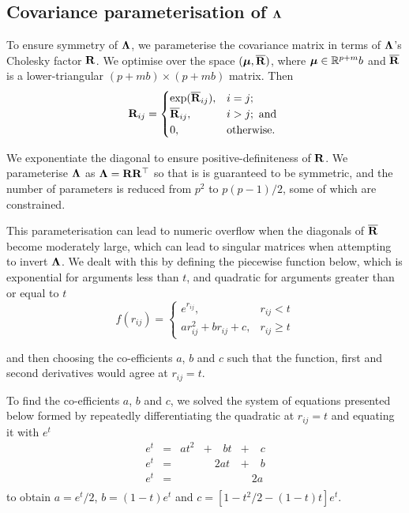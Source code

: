 \subsection{Covariance parameterisation of ${\boldsymbol \Lambda}$}
To ensure symmetry of ${\boldsymbol \Lambda}$, we parameterise the covariance matrix in
terms of ${\boldsymbol \Lambda}$'s Cholesky factor  ${\bf R}$. We optimise
over the space $({\boldsymbol \mu}, \overline{{\bf R}})$, where ${\boldsymbol \mu} \in {\mathbb{R}}^{p + m}b$ and
$\overline{{\bf R}}$ is a lower-triangular $(p + mb) \times (p + mb)$ matrix. Then
\begin{equation*}
	{\bf R}_{ij} =
	\begin{cases}
		\exp(\overline{{\bf R}}_{ij}), & i = j;\\
		\overline{{\bf R}}_{ij},       & i > j; \text{ and }\\
		0,                         & \text{otherwise}. 
	\end{cases}
\end{equation*}
		
\noindent We exponentiate the diagonal to ensure positive-definiteness of
${\bf R}$. We parameterise ${\boldsymbol \Lambda}$ as ${\boldsymbol \Lambda} = {\bf R} {\bf R}^\top$ so that is is
guaranteed to be symmetric, and the number of parameters is reduced from $p^2$
to $p(p-1)/2$, some of which are constrained. 

This parameterisation can lead to numeric overflow when the diagonals of
$\overline{{\bf R}}$ become moderately large, which can lead to singular matrices
when attempting to invert ${\boldsymbol \Lambda}$. We dealt with this by defining the
piecewise function below, which is exponential for arguments less than $t$, and
quadratic for arguments greater than or equal to $t$
\begin{equation}
\label{eq:piecewise_function}
f(r_{ij}) =
\begin{cases}
    e^{r_{ij}}, & r_{ij} < t                   \\
    a r_{ij}^2 + b r_{ij} + c, & r_{ij} \geq t 
\end{cases}
\end{equation}

\noindent and then choosing the co-efficients $a$, $b$ and $c$ such that the
function, first and second derivatives would agree at $r_{ij} = t$.

To find the co-efficients $a$, $b$ and $c$, we solved the system of equations
presented below formed by repeatedly  differentiating the quadratic at $r_{ij}
=  t$ and equating it with $e^t$
\begin{equation}
\label{eq:system_of_equations}
\begin{array}{lllll}
	e^t & = & a t^2 & + \quad b t & + \quad c \\
	e^t & = &       & \quad 2a t  & + \quad b \\
	e^t & = &       &             & \quad 2a  \\
\end{array}
\end{equation}
\noindent to obtain $a = e^t / 2$, $b = (1 - t) e^t$ and $c = [1 - t^2/2 - (1 -
t) t] e^t$.

